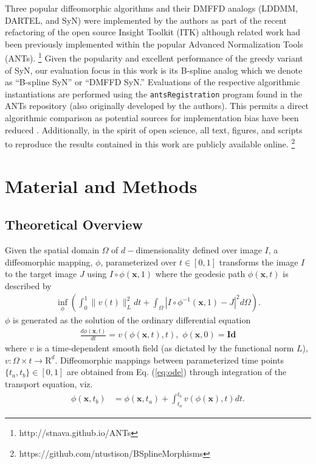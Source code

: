 \documentclass{frontiersSCNS}
\begin{document}
Three popular diffeomorphic algorithms and their DMFFD
analogs (LDDMM, DARTEL, and SyN) were implemented by the authors as
part of the recent refactoring of the open source Insight Toolkit
(ITK) although related work had been previously implemented within the
popular Advanced Normalization Tools (ANTs).%
\footnote{
http://stnava.github.io/ANTs
}
Given the popularity and excellent performance of the greedy variant
of SyN, our evaluation focus in this work is its B-spline
analog which we denote as ``B-spline SyN'' or ``DMFFD SyN.''
Evaluations of the respective algorithmic
instantiations are performed using the \verb#antsRegistration# program
found in the ANTs repository (also originally developed by the
authors).  This permits a direct algorithmic comparison as potential
sources for implementation bias have been reduced
\citep{tustison2013}.  Additionally, in the spirit of open science,
all text, figures, and scripts to reproduce the results contained in
this work are publicly available online.%
\footnote{
https://github.com/ntustison/BSplineMorphisms
}

\section{Material and Methods}

\subsection{Theoretical Overview}

Given the spatial domain $\Omega$ of $d-$dimensionality
defined over image $I$, a diffeomorphic
mapping, $\phi$, parameterized over $t \in [0,1]$ transforms the image
$I$ to the target image $J$ using $I\circ\phi(\mathbf{x},1)$ where the
geodesic path $\phi(\mathbf{x},t)$ is described by \citep{beg2005}
\begin{align}
  \inf_{\phi} \left( \int_0^1 \|v(t)\|_L^2 dt +
                     \int_{\Omega} | I \circ \phi^{-1}(\mathbf{x},1) - J |^2 d\Omega
              \right).
  \label{eq:lddmm}
\end{align}
$\phi$ is generated as the solution of the ordinary differential equation
\begin{align}
  \frac{d \phi(\mathbf{x},t)}{dt} = v( \phi(\mathbf{x},t), t ),\,\, \phi(\mathbf{x},0) = \mathbf{Id}
\label{eq:ode}
\end{align}
where $v$ is a time-dependent smooth field (as dictated by the functional norm $L$), $v : \Omega \times t
\rightarrow \mathrm{R}^d$.  Diffeomorphic mappings
between parameterized time points $\{t_a,t_b\} \in [0,1]$
are obtained from  Eq. (\ref{eq:ode}) through integration of the transport
equation, viz.
\begin{align}
  \label{eq:integral}
\phi(\mathbf{x},t_b) &= \phi(\mathbf{x},t_a) + \int_{t_a}^{t_b} v(\phi(\mathbf{x}), t) dt.
\end{align}
\end{document}
